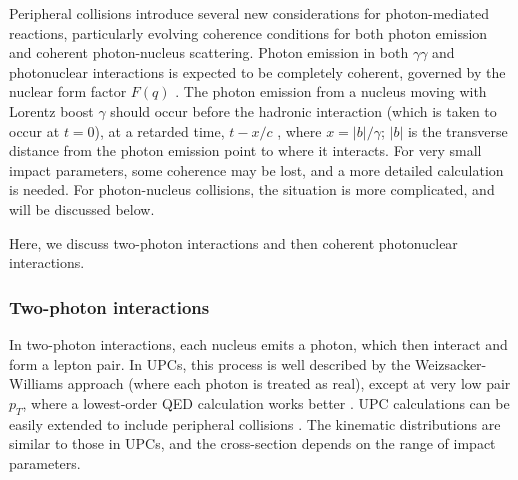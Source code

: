 \documentclass[../report.tex]{subfiles}
\begin{document}
Peripheral collisions introduce several new considerations for  photon-mediated reactions, particularly evolving coherence conditions for both photon emission and coherent photon-nucleus scattering.  Photon emission in both $\gamma\gamma$ and photonuclear interactions is expected to be completely coherent, governed by the nuclear form factor $F(q)$ \cite{Vidovic:1992ik}.   The photon emission from a nucleus moving with Lorentz boost $\gamma$ should occur before the hadronic interaction (which is taken to occur at $t=0$), at a retarded time, $t-x/c$ \cite{Zha:2017jch}, where $x=|b|/\gamma$; $|b|$ is the transverse distance from the photon emission point to where it interacts.    For very small impact parameters, some coherence may be lost, and a more detailed calculation is needed.  For photon-nucleus collisions, the situation is more complicated, and will be discussed below. 

Here, we discuss two-photon interactions and then coherent photonuclear interactions. 

\subsubsection{Two-photon interactions}

In two-photon interactions, each nucleus emits a photon, which then interact and form a lepton pair.   In UPCs, this process is well described by the Weizsacker-Williams approach (where each photon is treated as real), except at very low pair $p_T$, where a lowest-order QED calculation works better \cite{Adams:2004rz}.     UPC calculations can be easily extended to include peripheral collisions \cite{Klein:2018cjh, Zha:2018ywo}.  The kinematic distributions are similar to those in UPCs, and the cross-section depends on the range of impact parameters.
\end{document}
